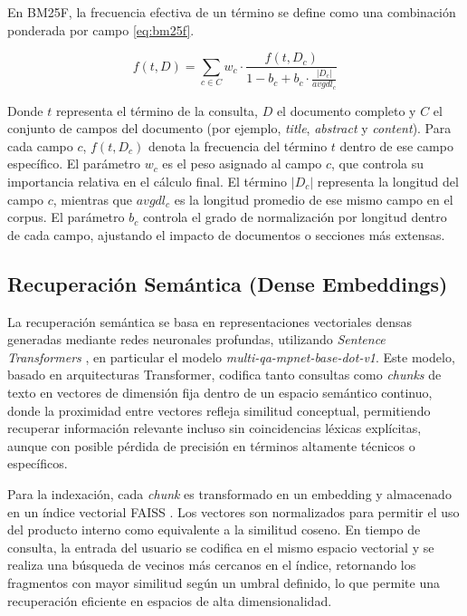 \documentclass[runningheads]{llncs}
\begin{document}
En BM25F, la frecuencia efectiva de un término se define como una combinación ponderada por campo \eqref{eq:bm25f}.

\begin{equation}
    f(t, D) = \sum_{c \in C} w_c \cdot \frac{f(t, D_c)}{1 - b_c + b_c \cdot \frac{|D_c|}{avgdl_c}}
    \label{eq:bm25f}
\end{equation}

Donde $t$ representa el término de la consulta, $D$ el documento completo y $C$ el conjunto de campos del documento 
(por ejemplo, \textit{title}, \textit{abstract} y \textit{content}). 
Para cada campo $c$, $f(t, D_c)$ denota la frecuencia del término $t$ dentro de ese campo específico. 
El parámetro $w_c$ es el peso asignado al campo $c$, que controla su importancia relativa en el cálculo final. 
El término $|D_c|$ representa la longitud del campo $c$, mientras que $avgdl_c$ es la longitud promedio de ese mismo campo en el corpus. 
El parámetro $b_c$ controla el grado de normalización por longitud dentro de cada campo, ajustando el impacto de documentos o secciones más extensas.

\subsection{Recuperación Semántica (Dense Embeddings)}

La recuperación semántica se basa en representaciones vectoriales densas generadas mediante redes neuronales profundas, 
utilizando \textit{Sentence Transformers} \cite{sentence_transformers}, 
en particular el modelo \textit{multi-qa-mpnet-base-dot-v1}. 
Este modelo, basado en arquitecturas Transformer, codifica tanto consultas como \textit{chunks} 
de texto en vectores de dimensión fija dentro de un espacio semántico continuo, 
donde la proximidad entre vectores refleja similitud conceptual, 
permitiendo recuperar información relevante incluso sin coincidencias léxicas explícitas, 
aunque con posible pérdida de precisión en términos altamente técnicos o específicos.

Para la indexación, cada \textit{chunk} es transformado en un embedding 
y almacenado en un índice vectorial FAISS \cite{faiss}. 
Los vectores son normalizados para permitir el uso del producto interno como equivalente a la similitud coseno. 
En tiempo de consulta, la entrada del usuario se codifica en el mismo espacio vectorial y 
se realiza una búsqueda de vecinos más cercanos en el índice, 
retornando los fragmentos con mayor similitud según un umbral definido, 
lo que permite una recuperación eficiente en espacios de alta dimensionalidad.
\end{document}
